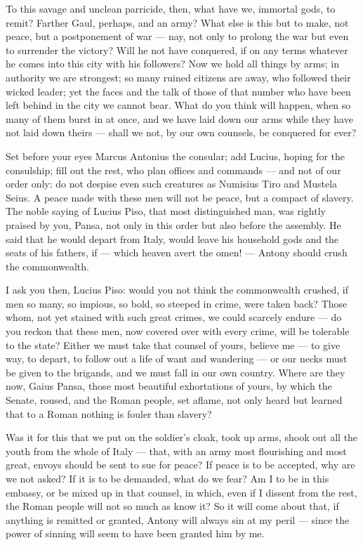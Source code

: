 To this savage and unclean parricide, then, what have we, immortal gods, to remit? Farther Gaul, perhaps, and an army? What else is this but to make, not peace, but a postponement of war --- nay, not only to prolong the war but even to surrender the victory? Will he not have conquered, if on any terms whatever he comes into this city with his followers? Now we hold all things by arms; in authority we are strongest; so many ruined citizens are away, who followed their wicked leader; yet the faces and the talk of those of that number who have been left behind in the city we cannot bear. What do you think will happen, when so many of them burst in at once, and we have laid down our arms while they have not laid down theirs --- shall we not, by our own counsels, be conquered for ever?

 Set before your eyes Marcus Antonius the consular; add Lucius, hoping for the consulship; fill out the rest, who plan offices and commands --- and not of our order only: do not despise even such creatures as Numisius Tiro and Mustela Seius. A peace made with these men will not be peace, but a compact of slavery. The noble saying of Lucius Piso, that most distinguished man, was rightly praised by you, Pansa, not only in this order but also before the assembly. He said that he would depart from Italy, would leave his household gods and the seats of his fathers, if --- which heaven avert the omen! --- Antony should crush the commonwealth.

 I ask you then, Lucius Piso: would you not think the commonwealth crushed, if men so many, so impious, so bold, so steeped in crime, were taken back? Those whom, not yet stained with such great crimes, we could scarcely endure --- do you reckon that these men, now covered over with every crime, will be tolerable to the state? Either we must take that counsel of yours, believe me --- to give way, to depart, to follow out a life of want and wandering --- or our necks must be given to the brigands, and we must fall in our own country. Where are they now, Gaius Pansa, those most beautiful exhortations of yours, by which the Senate, roused, and the Roman people, set aflame, not only heard but learned that to a Roman nothing is fouler than slavery?

 Was it for this that we put on the soldier's cloak, took up arms, shook out all the youth from the whole of Italy --- that, with an army most flourishing and most great, envoys should be sent to sue for peace? If peace is to be accepted, why are we not asked? If it is to be demanded, what do we fear? Am I to be in this embassy, or be mixed up in that counsel, in which, even if I dissent from the rest, the Roman people will not so much as know it? So it will come about that, if anything is remitted or granted, Antony will always sin at my peril --- since the power of sinning will seem to have been granted him by me.

